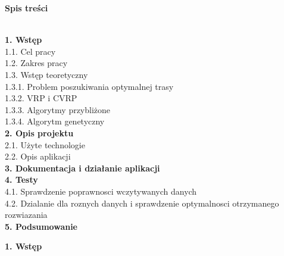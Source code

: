 \documentclass[a4paper, twoside, 12pt, justified]{article}
\begin{document}
	\begin{flushleft}
		\begin{large}\textbf{Spis treści}\end{large}
		\vspace{5mm}\\
		\textbf{1. Wstęp }\\
			\hspace{5mm}1.1. Cel pracy\\
			\hspace{5mm}1.2. Zakres pracy\\
			\hspace{5mm}1.3. Wstęp teoretyczny\\
			\hspace{13mm}1.3.1. Problem poszukiwania optymalnej trasy\\
			\hspace{13mm}1.3.2. VRP i CVRP\\
			\hspace{13mm}1.3.3. Algorytmy przybliżone\\
			\hspace{13mm}1.3.4. Algorytm genetyczny\\
			\textbf{2. Opis projektu}\\
			\hspace{5mm}2.1. Użyte technologie\\
			\hspace{5mm}2.2. Opis aplikacji\\
			\textbf{3. Dokumentacja i działanie aplikacji}\\
			\textbf{4. Testy}\\
			\hspace{5mm}4.1. Sprawdzenie poprawnosci wczytywanych danych\\
			\hspace{5mm}4.2. Dzialanie dla roznych danych i sprawdzenie optymalnosci otrzymanego rozwiazania\\
			\textbf{5. Podsumowanie}\\
		
	\end{flushleft}
	\newpage
	
		
	\begin{flushleft}
		\begin{large}
			\textbf{1. Wstęp }
		\end{large}
	\end{flushleft}
	\vspace{5mm} %
	
\end{document}
